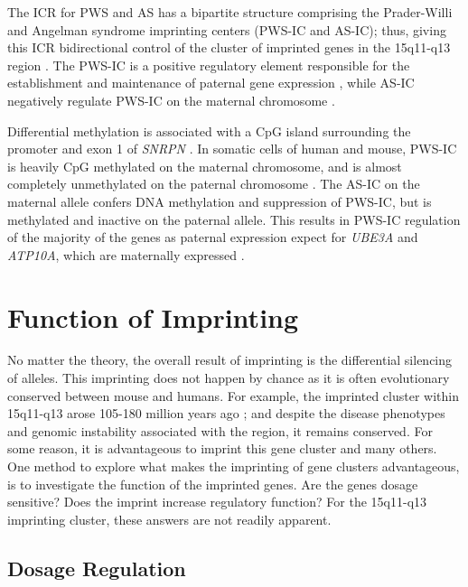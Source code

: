 {The ICR for PWS and AS has a bipartite structure comprising the Prader-Willi and Angelman syndrome imprinting centers (PWS-IC and AS-IC); thus, giving this ICR bidirectional control of the cluster of imprinted genes in the 15q11-q13 region \cite{Nicholls1996}. The PWS-IC is a positive regulatory element responsible for the establishment and maintenance of paternal gene expression \cite{Nicholls2001}, while AS-IC negatively regulate PWS-IC on the maternal chromosome \cite{Brannan1999}.

Differential methylation is associated with a CpG island surrounding the promoter and exon 1 of \textit{SNRPN} \cite{Blaydes1999}. In somatic cells of human and mouse, PWS-IC is heavily CpG methylated on the maternal chromosome, and is almost completely unmethylated on the paternal chromosome \cite{Glenn1996,Shemer1997}. The AS-IC on the maternal allele confers DNA methylation and suppression of PWS-IC, but is methylated and inactive on the paternal allele. This results in PWS-IC regulation of the majority of the genes as paternal expression expect for \textit{UBE3A} and \textit{ATP10A}, which are maternally expressed \cite{Brannan1999, Kantor2006}.

\section{Function of Imprinting}

No matter the theory, the overall result of imprinting is the differential silencing of alleles. This imprinting does not happen by chance as it is often evolutionary conserved between mouse and humans. For example, the imprinted cluster within 15q11-q13 arose 105-180 million years ago \cite{Rapkins2006}; and despite the disease phenotypes and genomic instability associated with the region, it remains conserved. For some reason, it is advantageous to imprint this gene cluster and many others. One method to explore what makes the imprinting of gene clusters advantageous, is to investigate the function of the imprinted genes. Are the genes dosage sensitive? Does the imprint increase regulatory function? For the 15q11-q13 imprinting cluster, these answers are not readily apparent.

\subsection{Dosage Regulation}

}
